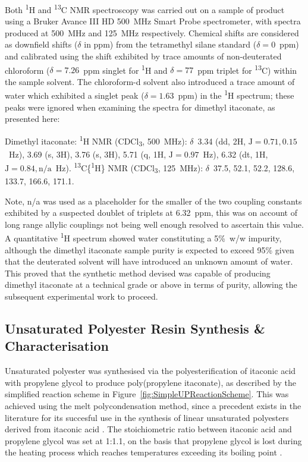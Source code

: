 Both \textsuperscript{1}H and \textsuperscript{13}C NMR
 spectroscopy was carried out on a sample of product using a
 Bruker Avance III HD 500~\unit{\mega\hertz} Smart Probe spectrometer,
 with spectra produced at 500~\unit{\mega\hertz} and
 125~\unit{\mega\hertz} respectively.
Chemical shifts are considered as downfield shifts (\(\delta\) in ppm) from
 the tetramethyl silane standard (\(\delta=0\)~ppm) and calibrated using the
 shift exhibited by trace amounts of non-deuterated chloroform
 (\(\delta=7.26\)~ppm singlet for \textsuperscript{1}H and \(\delta=77\)~ppm 
 triplet for \textsuperscript{13}C) within the sample solvent.
The chloroform-d solvent also introduced a trace amount of water which
 exhibited a singlet peak (\(\delta =1.63\)~ppm) in the \textsuperscript{1}H
 spectrum; these peaks were ignored when examining the spectra for
 dimethyl itaconate, as presented here:

Dimethyl itaconate:
\textsuperscript{1}H NMR (CDCl\textsubscript{3},
 500~\unit{\mega\hertz}): 
 \(\delta\)~3.34 (dd, 2H, \(\mathrm{J}=0.71,0.15\)~\unit{\hertz}),
 3.69 (s, 3H),
 3.76 (s, 3H),
 5.71 (q, 1H, \(\mathrm{J}=0.97\)~\unit{\hertz}),
 6.32 (dt, 1H, \(\mathrm{J}=0.84, \mathrm{n/a}\)~\unit{\hertz}).
\textsuperscript{13}C\{\textsuperscript{1}H\} NMR
 (CDCl\textsubscript{3}, 125~\unit{\mega\hertz}):
 \(\delta\)~37.5, 52.1, 52.2, 128.6, 133.7, 166.6,
 171.1.

Note, n/a was used as a placeholder for the smaller of the two coupling
 constants exhibited by a suspected doublet of triplets at 6.32~ppm, this
 was on account of long range allylic couplings not being well enough
 resolved to ascertain this value.
A quantitative \textsuperscript{1}H spectrum showed water constituting a
 5\unit{\percent}~w/w impurity, although the dimethyl itaconate sample
 purity is expected to exceed 95\unit{\percent} given that the deuterated
 solvent will have introduced an unknown amount of water.
This proved that the synthetic method devised was capable of producing
 dimethyl itaconate at a technical grade or above in terms of purity,
 allowing the subsequent experimental work to proceed.

\subsection{Unsaturated Polyester Resin Synthesis \& Characterisation}
Unsaturated polyester was synthesised via the polyesterification of
 itaconic acid with propylene glycol to produce poly(propylene itaconate),
 as described by the simplified reaction scheme in
 Figure~\ref{fig:SimpleUPReactionScheme}.
This was achieved using the melt polycondensation method, since a precedent
 exists in the literature for its succesful use in the synthesis of
 linear unsaturated polyesters derived from itaconic acid
 \autocite{Dai2017,Spasojevic2021,Pantic2022,Panic2017}.
The stoichiometric ratio between itaconic acid and propylene glycol was
 set at 1:1.1, on the basis that propylene glycol is lost during the
 heating process which reaches temperatures exceeding its boiling point
 \autocite{Parkyn1967}.

